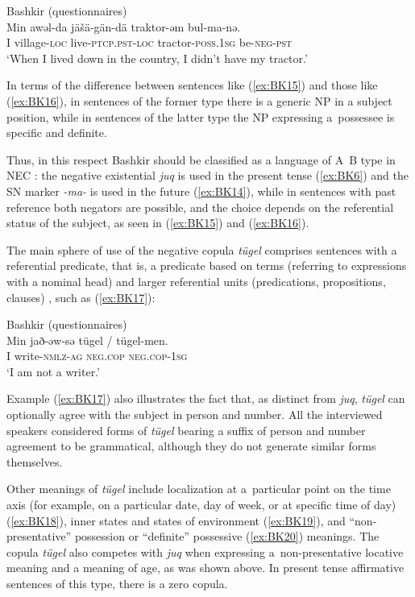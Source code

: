\documentclass[output=paper,draft,draftmode,colorlinks,citecolor=brown]{langscibook}
\begin{document}
\ea Bashkir (questionnaires) \label{ex:BK16}\\
    \gll Min	awǝl-da		jäšä-gän-dä		traktor-ǝm  bul-ma-nǝ.\\
    I		village-\textsc{loc}	live-\textsc{ptcp.pst-loc}	tractor-\textsc{poss.1sg} be-\textsc{neg-pst}\\
	\glt `When I lived down in the country, I didn’t have my tractor.'
\z


In terms of the difference between sentences like (\ref{ex:BK15}) and those like (\ref{ex:BK16}), in sentences of the former type there is a generic NP in a subject position, while in sentences of the latter type the NP expressing a possessee is specific and definite.

Thus, in this respect Bashkir should be classified as a language of A~B type in NEC \citep{Veselinova2016}: the negative existential \textit{juq} is used in the present tense (\ref{ex:BK6}) and the SN marker \textit{-ma-} is used in the future (\ref{ex:BK14}), while in sentences with past reference both negators are possible, and the choice depends on the referential status of the subject, as seen in (\ref{ex:BK15}) and (\ref{ex:BK16}).

The main sphere of use of the negative copula \textit{tügel} comprises sentences with a referential predicate, that is, a predicate based on terms (referring to expressions with a nominal head) and larger referential units (predications, propositions, clauses) \citep[77–91]{hengeveld1992a}, such as (\ref{ex:BK17}):

\ea Bashkir (questionnaires) \label{ex:BK17}\\
	\gll Min	jað-əw-sə			tügel			{/ tügel-men.}\\
	I		write-\textsc{nmlz-ag}	\textsc{neg.cop}		\textsc{neg.cop-1sg}\\
	\glt `I am not a writer.'
\z

Example (\ref{ex:BK17}) also illustrates the fact that, as distinct from \textit{juq}, \textit{tügel} can optionally agree with the subject in person and number. All the interviewed speakers considered forms of \textit{tügel} bearing a suffix of person and number agreement to be grammatical, although they do not generate similar forms themselves.

Other meanings of \textit{tügel} include localization at a particular point on the time axis (for example, on a particular date, day of week, or at specific time of day) (\ref{ex:BK18}), inner states and states of environment (\ref{ex:BK19}), and “non-presentative” possession \citep{hengeveld1992a} or “definite” possessive \citep{stassen2009a} (\ref{ex:BK20}) meanings. The copula \textit{tügel} also competes with \textit{juq} when expressing a non-presentative locative meaning and a meaning of age, as was shown above. In present tense affirmative sentences of this type, there is a zero copula.
\end{document}
